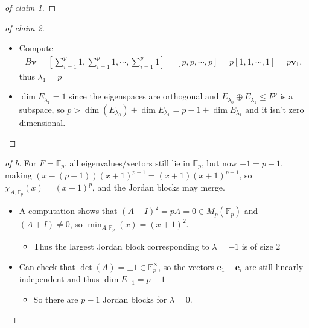 \begin{solution}
\begin{proof}[of claim 1]
\end{proof}

\begin{proof}[of claim 2]

\envlist

\begin{itemize}
\tightlist
\item
  Compute
  \begin{align*}B\mathbf{v} = {\left[ {\sum_{i=1}^p 1, \sum_{i=1}^p 1, \cdots, \sum_{i=1}^p 1} \right]} = {\left[ {p, p, \cdots, p} \right]} = p {\left[ {1, 1, \cdots, 1} \right]} = p\mathbf{v}_1,\end{align*}
  thus \(\lambda_1 = p\)
\item
  \(\dim E_{\lambda_1} = 1\) since the eigenspaces are orthogonal and
  \(E_{\lambda_0} \oplus E_{\lambda_1} \leq F^p\) is a subspace, so
  \(p > \dim(E_{\lambda_0}) + \dim E_{\lambda_1} = p-1 + \dim E_{\lambda_1}\)
  and it isn't zero dimensional.
\end{itemize}

\end{proof}

\begin{proof}[of b]

For \(F = {\mathbb{F}}_p\), all eigenvalues/vectors still lie in
\({\mathbb{F}}_p\), but now \(-1 = p-1\), making
\((x-(p-1))(x+1)^{p-1} = (x+1)(x+1)^{p-1}\), so
\(\chi_{A, {\mathbb{F}}_p}(x) = (x+1)^p\), and the Jordan blocks may
merge.

\begin{itemize}
\tightlist
\item
  A computation shows that \((A+I)^2 = pA = 0 \in M_p({\mathbb{F}}_p)\)
  and \((A+I) \neq 0\), so \(\min_{A, {\mathbb{F}}_p}(x) = (x+1)^2\).

  \begin{itemize}
  \tightlist
  \item
    Thus the largest Jordan block corresponding to \(\lambda = -1\) is
    of size 2
  \end{itemize}
\item
  Can check that \(\det(A) = \pm 1 \in {\mathbb{F}}_p^{\times}\), so the
  vectors \(\mathbf{e}_1 - \mathbf{e}_i\) are still linearly independent
  and thus \(\dim E_{-1} = p-1\)

  \begin{itemize}
  \tightlist
  \item
    So there are \(p-1\) Jordan blocks for \(\lambda = 0\).
  \end{itemize}
\end{itemize}


\end{proof}
\end{solution}
